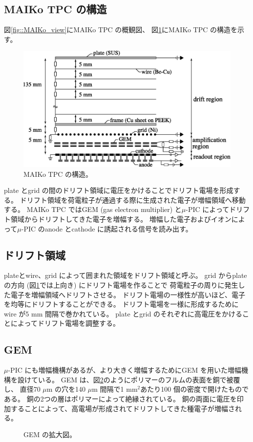 \subsection{MAIKo TPC の構造}
図\ref{fig::MAIKo_view}にMAIKo TPC の概観図、
図\ref{fig::MAIKo_cage}にMAIKo TPC の構造を示す。
\begin{figure}
  \centering
  \includegraphics[clip, width=0.9\columnwidth]{eps/MAIKo_cage.eps}
  \caption{MAIKo TPC の構造。}
  \label{fig::MAIKo_cage}
\end{figure}
plate とgrid の間のドリフト領域に電圧をかけることでドリフト電場を形成する。
ドリフト領域を荷電粒子が通過する際に生成された電子が増幅領域へ移動する。
MAIKo TPC ではGEM (gas electron multiplier) と$\mu$-PIC によってドリフト領域からドリフトしてきた電子を増幅する。
増幅した電子およびイオンによって$\mu$-PIC のanode とcathode に誘起される信号を読み出す。

\subsection{ドリフト領域}
plateとwire、grid によって囲まれた領域をドリフト領域と呼ぶ。
grid からplate の方向 (図\ref{fig::MAIKo_cage}では上向き) にドリフト電場を作ることで
荷電粒子の周りに発生した電子を増幅領域へドリフトさせる。
ドリフト電場の一様性が高いほど、電子を均等にドリフトすることができる。
ドリフト電場を一様に形成するためにwire が5 mm 間隔で巻かれている。
plate とgrid のそれぞれに高電圧をかけることによってドリフト電場を調整する。

\subsection{GEM}
$\mu$-PIC にも増幅機構があるが、より大きく増幅するためにGEM を用いた増幅機構を設けている。
GEM は、図\ref{pic::GEM}のようにポリマーのフルムの表面を銅で被覆し、
直径70 $\mu$m の穴を140 $\mu$m 間隔で1 mm$^2$あたり100 個の密度で開けたものである。
銅の2つの層はポリマーによって絶縁されている。
銅の両面に電圧を印加することによって、高電場が形成されてドリフトしてきた種電子が増幅される。
\begin{figure}
  \centering
  \caption{GEM の拡大図。}
  \label{pic::GEM}
\end{figure}

